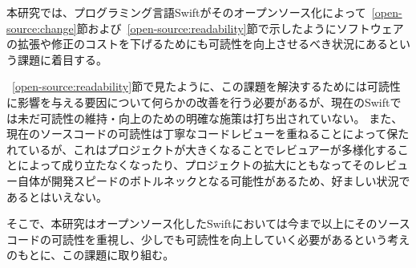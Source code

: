 本研究では、プログラミング言語Swiftがそのオープンソース化によって~\ref{open-source:change}節および~\ref{open-source:readability}節で示したようにソフトウェアの拡張や修正のコストを下げるためにも可読性を向上させるべき状況にあるという課題に着目する。

~\ref{open-source:readability}節で見たように、この課題を解決するためには可読性に影響を与える要因について何らかの改善を行う必要があるが、現在のSwiftでは未だ可読性の維持・向上のための明確な施策は打ち出されていない。
また、現在のソースコードの可読性は丁寧なコードレビューを重ねることによって保たれているが、これはプロジェクトが大きくなることでレビュアーが多様化することによって成り立たなくなったり、プロジェクトの拡大にともなってそのレビュー自体が開発スピードのボトルネックとなる可能性があるため、好ましい状況であるとはいえない。

そこで、本研究はオープンソース化したSwiftにおいては今まで以上にそのソースコードの可読性を重視し、少しでも可読性を向上していく必要があるという考えのもとに、この課題に取り組む。

